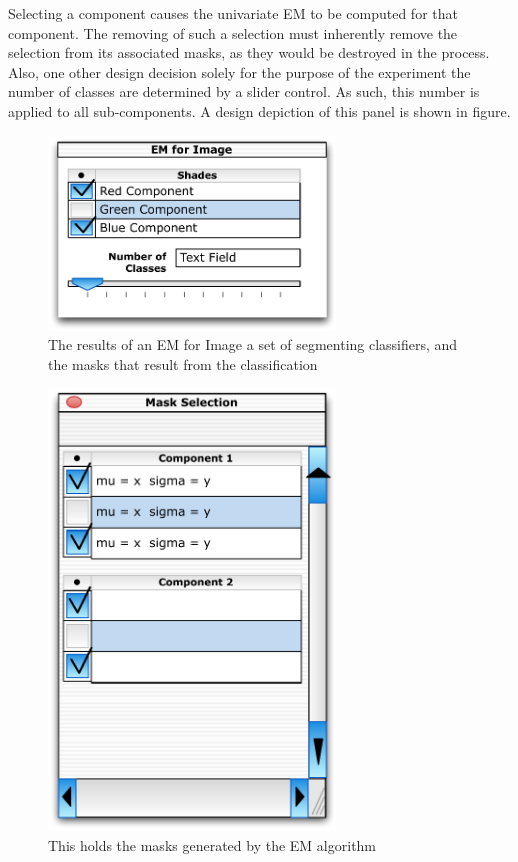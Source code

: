 \documentclass[12pt]{report}
\begin{document}
Selecting a component causes the univariate EM to be computed for that component.  The removing of such a selection must inherently remove the selection from its associated masks, as they would be destroyed in the process.  Also, one other design decision solely for the purpose of the experiment the number of classes are determined by a slider control.  As such, this number is applied to all sub-components.  A design depiction of this panel is shown in figure.
\begin{figure}[htbp] %
   \centering
   \includegraphics[width=3in]{emComponentSelection.pdf} 
   \caption{The results of an EM for Image
a set of segmenting classifiers, and the 
masks that result from the classification}
   \label{emComponentSelection}
\end{figure}
  


\begin{figure}[htbp] %
   \centering
   \includegraphics[width=3in]{maskSelector.pdf} 
   \caption{This holds the masks generated by the EM algorithm}
   \label{maskSelector}
\end{figure}
\end{document}
